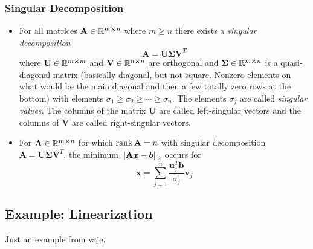 \documentclass[11pt, a4paper]{article}
\newcommand{\R}{\mathbb{R}} %
\newcommand{\mat}[1]{\mathbf{#1}} %
\begin{document}
\subsubsection{Singular Decomposition}
\begin{itemize}
	\item For all matrices $ \mat{A} \in \R^{m \cross n} $ where $ m \geq n $ there exists a \textit{singular decomposition} 
	\begin{equation*}
		\mat{A} = \mat{U} \mat{\Sigma}\mat{V}^{T}
	\end{equation*}
	where $ \mat{U} \in \R^{m \cross m}$ and $ \mat{V} \in \R^{n \cross n} $ are orthogonal and $ \mat{\Sigma} \in \R^{m \cross n} $ is a quasi-diagonal matrix (basically diagonal, but not square. Nonzero elements on what would be the main diagonal and then a few totally zero rows at the bottom) with elements $ \sigma_{1} \geq \sigma_{2} \geq \cdots \geq \sigma_{n} $. The elements $ \sigma_{j} $ are called \textit{singular values}. The columns of the matrix $ \mat{U} $ are called left-singular vectors and the columns of $ \mat{V} $ are called right-singular vectors.
	
	\item For $ \mat{A} \in \R^{m \cross n} $ for which $ \rank \mat{A} = n $ with singular decomposition $ \mat{A} = \mat{U} \mat{\Sigma}\mat{V}^{T} $, the minimum $ \norm{\mat{A} \bm{x} - \bm{b}}_{2} $ occurs for
	\begin{equation*}
		\bm{x} = \sum_{j=1}^{n} \frac{\bm{u}_{j}^{T}\bm{b}}{\sigma_{j}}\bm{v}_{j}
	\end{equation*}
	
\end{itemize}



\iffalse
\subsection{Example: Linearization}
Just an example from vaje.
\end{document}

